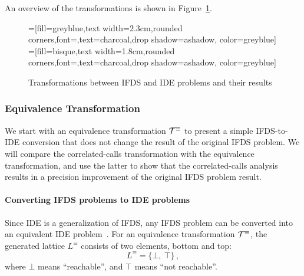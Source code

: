An overview of the transformations is shown in Figure~\ref{fig:transformations}.
\begin{figure}
  \centering
  =[fill=greyblue,text width=2.3cm,rounded corners,font=\small,text=charcoal,drop shadow={ashadow, color=greyblue}]
  =[fill=bisque,text width=1.8cm,rounded corners,font=\small,text=charcoal,drop shadow={ashadow, color=greyblue}]
  \caption{Transformations between IFDS and IDE problems and their results}%
  \label{fig:transformations}%
\end{figure}

\subsubsection{Equivalence Transformation}\label{sec:equivtrans}
We start with an equivalence transformation $\mathcal T^\equiv$ to present a simple IFDS-to-IDE conversion that does not change the result of the original IFDS problem. We will compare the correlated-calls transformation with the equivalence transformation, and use the latter to show  that the correlated-calls analysis results in a
precision improvement of the original IFDS problem result.

\paragraph{Converting IFDS problems to IDE problems}
Since IDE is a generalization of IFDS, any IFDS problem can be converted into an equivalent IDE problem~\cite{sagiv1996precise}.
For an equivalence transformation $\mathcal T^\equiv$, the generated lattice $L^\equiv$ consists of two elements, bottom and top:
\[
    L^\equiv=\{\bot,\ \top\}\,,
\]
where $\bot$ means ``reachable'', and $\top$ means ``not reachable''. 

